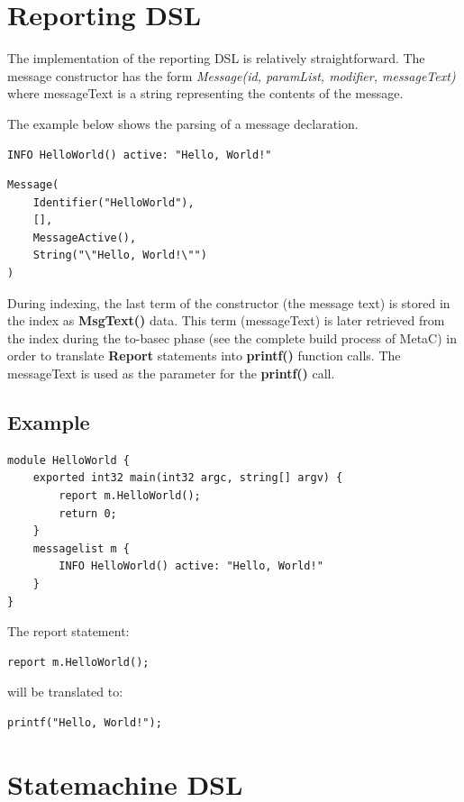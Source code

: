 \documentclass[a4paper,10pt,titlepage]{report}
\begin{document}
\chapter{Reporting DSL}
The implementation of the reporting DSL is relatively straightforward. The message constructor has the form \emph{Message(id, paramList, modifier, messageText)} where messageText is a string representing the contents of the message. 

The example below shows the parsing of a message declaration.

\begin{lstlisting}
INFO HelloWorld() active: "Hello, World!"
\end{lstlisting}

\begin{lstlisting}
Message(
    Identifier("HelloWorld"), 
    [], 
    MessageActive(), 
    String("\"Hello, World!\"")
)
\end{lstlisting}

During indexing, the last term of the constructor (the message text) is stored in the index as \textbf{MsgText()} data. This term (messageText) is later retrieved from the index during the to-basec phase (see the complete build process of MetaC) in order to translate \textbf{Report} statements into \textbf{printf()} function calls. The messageText is used as the parameter for the \textbf{printf()} call.

\section{Example}
\begin{lstlisting}
module HelloWorld { 
    exported int32 main(int32 argc, string[] argv) { 
        report m.HelloWorld(); 
        return 0;
    }
    messagelist m { 
        INFO HelloWorld() active: "Hello, World!"
    }
}
\end{lstlisting}

\newpage
{\setlength{\parindent}{0cm}
The report statement: 
}
\begin{lstlisting}
report m.HelloWorld(); 
\end{lstlisting}
{\setlength{\parindent}{0cm}
will be translated to:
}
\begin{lstlisting}
printf("Hello, World!");
\end{lstlisting}


\chapter{Statemachine DSL}
\end{document}
